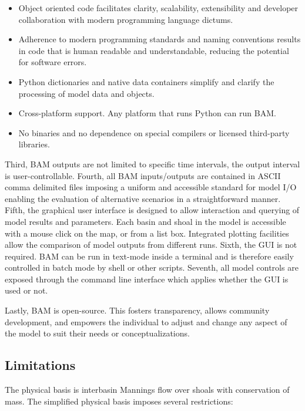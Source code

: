 \renewcommand{\labelitemi}{\textendash}
\begin{itemize}  
  \itemsep-8pt
  \item Object oriented code facilitates clarity, scalability, extensibility and developer collaboration with modern programming language dictums.
  \item Adherence to modern programming standards and naming conventions results in code that is human readable and understandable, reducing the potential for software errors. 
  \item Python dictionaries and native data containers simplify and clarify the processing of model data and objects. 
  \item Cross-platform support.  Any platform that runs Python can run BAM. 
  \item No binaries and no dependence on special compilers or licensed third-party libraries. 
\end{itemize}

Third, BAM outputs are not limited to specific time intervals, the output interval is user-controllable.  Fourth, all BAM inputs/outputs are contained in ASCII comma delimited files imposing a uniform and accessible standard for model I/O enabling the evaluation of alternative scenarios in a straightforward manner.  Fifth, the graphical user interface is designed to allow interaction and querying of model results and parameters. Each basin and shoal in the model is accessible with a mouse click on the map, or from a list box.  Integrated plotting facilities allow the comparison of model outputs from different runs.  Sixth, the GUI is not required.  BAM can be run in text-mode inside a terminal and is therefore easily controlled in batch mode by shell or other scripts. Seventh, all model controls are exposed through the command line interface which applies whether the GUI is used or not. 

Lastly, BAM is open-source.  This fosters transparency, allows community development, and empowers the individual to adjust and change any aspect of the model to suit their needs or conceptualizations. 


\subsection{Limitations}
\label{sec:Limitations}

The physical basis is interbasin Mannings flow over shoals with conservation of mass.  The simplified physical basis imposes several restrictions:

